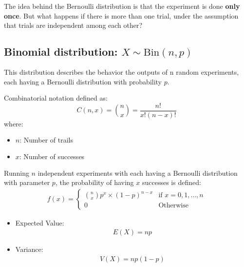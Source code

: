 \documentclass[10pt,a4paper]{article}
\begin{document}
The idea behind the Bernoulli distribution is that the experiment is done \textbf{only once}. But
what happens if there is more than one trial, under the assumption that trials are independent
among each other?

\pagebreak

\subsection{Binomial distribution: $X \sim \text{Bin}(n,p)$}

This distribution describes the behavior the outputs of n random experiments, each having a Bernoulli distribution with probability $p$.

Combinatorial notation defined as:
$$
    C(n,x) = {n\choose x}= \frac{n!}{x!(n-x)!}
$$
where:
\begin{itemize}
    \item $n$: Number of trails
    \item $x$: Number of successes
\end{itemize}

Running $n$ independent experiments with each having a Bernoulli distribution with parameter $p$,
the probability of having $x$ successes is defined:
\begin{align*}
    f(x) = 
    \begin{cases}
        {n \choose x} p^x \times (1-p)^{n-x} & \text{if } x = 0,1,\dots,n \\ 
        0 & \text{Otherwise}
    \end{cases}
\end{align*}

\begin{itemize}
    \item Expected Value:
    \begin{align*}
        E(X) = np
    \end{align*}
    \item Variance: 
    \begin{align*}
         V(X) = np(1-p)
    \end{align*}
\end{itemize}
\end{document}
